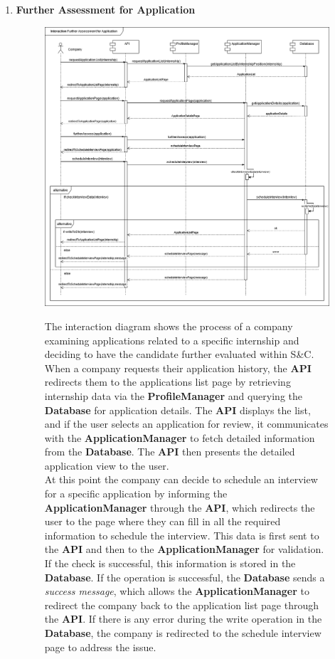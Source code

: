 \begin{enumerate}
    \newpage
    \item \textbf{Further Assessment for Application}
    \begin{figure}[h!]
            \centering  \includegraphics[width=1\textwidth]{DD/Images/Interactions/INT15_FurtherAssessmentForApplication.drawio.png}
            \label{fig:ComponentViewDiagram}
            \caption*{
                The interaction diagram shows the process of a company examining applications related to a specific internship and deciding to have the candidate further evaluated within S\&C. When a company requests their application history, the \textbf{API} redirects them to the applications list page by retrieving internship data via the \textbf{ProfileManager} and querying the \textbf{Database} for application details. The \textbf{API} displays the list, and if the user selects an application for review, it communicates with the \textbf{ApplicationManager} to fetch detailed information from the \textbf{Database}. The \textbf{API} then presents the detailed application view to the user. 
                \\At this point the company can decide to schedule an interview for a specific application by informing the \textbf{ApplicationManager} through the \textbf{API}, which redirects the user to the page where they can fill in all the required information to schedule the interview. This data is first sent to the \textbf{API} and then to the \textbf{ApplicationManager} for validation. If the check is successful, this information is stored in the \textbf{Database}. 
                If the operation is successful, the \textbf{Database} sends a \textit{success message}, which allows the \textbf{ApplicationManager} to redirect the company back to the application list page through the \textbf{API}. 
                If there is any error during the write operation in the \textbf{Database}, the company is redirected to the schedule interview page to address the issue.
            }
    \end{figure}


\end{enumerate}
